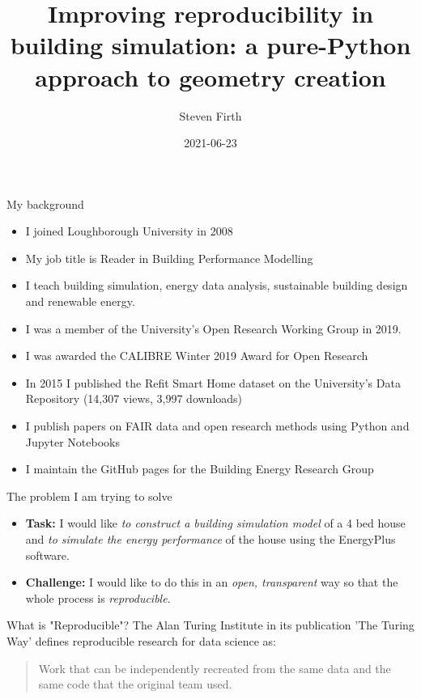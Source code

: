 \documentclass{beamer}
\title[Improving reproducibility in building simulation]{Improving reproducibility in building simulation: a pure-Python approach to geometry creation}
\author{Steven Firth}
\institute{Loughborough University}
\date{2021-06-23}
\begin{document}
	
	\begin{frame}
		\maketitle
	\end{frame}
	
	\begin{frame}{My background}
		\begin{itemize}
			\item I joined Loughborough University in 2008
			\item My job title is Reader in Building Performance Modelling
			\item I teach building simulation, energy data analysis, sustainable building design and renewable energy.
			\item I was a member of the University's Open Research Working Group in 2019.
			\item I was awarded the CALIBRE Winter 2019 Award for Open Research
			\item In 2015 I published the Refit Smart Home dataset on the University's Data Repository (14,307 views, 3,997 downloads)
			\item I publish papers on FAIR data and open research methods using Python and Jupyter Notebooks 
			\item I maintain the GitHub pages for the Building Energy Research Group
			
		\end{itemize}
	\end{frame}
	
	\begin{frame}{The problem I am trying to solve}
		\begin{itemize}
			\item \textbf{Task:} I would like \emph{to construct a building simulation model} of a 4 bed house and \emph{to simulate the energy performance} of the house using the EnergyPlus software.
			\item \textbf{Challenge:} I would like to do this in an \emph{open, transparent} way so that the whole process is \emph{reproducible}. 
		\end{itemize}
	\end{frame}

	\begin{frame}{What is "Reproducible"?}
		The Alan Turing Institute in its publication 'The Turing Way' defines reproducible research for data science as: \\ [10pt]
		\begin{quote}
			Work that can be independently recreated from the same data and the same code that the original team used. 
		\end{quote}
	\end{frame}
\end{document}
